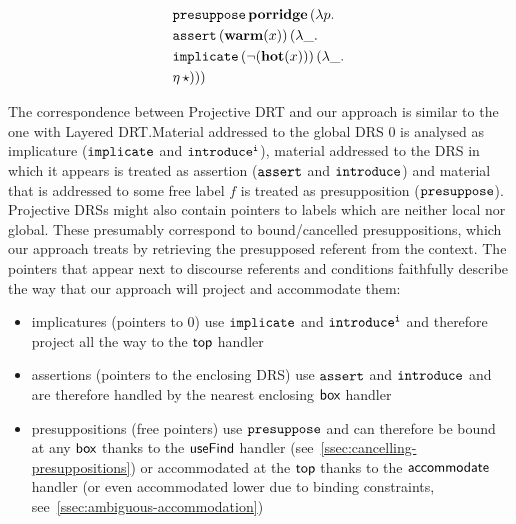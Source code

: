 \vspace*{3mm}
\begin{minipage}{.4\textwidth}
{
  \begin{center}
  \let \drsalignment = l
  \end{center}
}
\end{minipage}
\begin{minipage}{.4\textwidth}
  \begin{center}
  \begin{align*}
    &\mathtt{presuppose}\,\textbf{porridge}\,(\lambda p.\,  \\
    &\mathtt{assert}\,(\textbf{warm}(x))\,(\lambda \_.\,  \\
    &\mathtt{implicate}\,(\lnot (\textbf{hot}(x)))\,(\lambda \_.\,  \\
    &\eta\,\star)))
  \end{align*}
  \end{center}
\end{minipage}
\vspace{5mm}

The correspondence between Projective DRT and our approach is similar to
the one with Layered DRT.\@ Material addressed to the global DRS $0$ is
analysed as implicature ($\mathtt{implicate}$ and $\mathtt{introduce^i}$), material
addressed to the DRS in which it appears is treated as assertion
($\mathtt{assert}$ and $\mathtt{introduce}$) and material that is addressed to some
free label $f$ is treated as presupposition ($\mathtt{presuppose}$). Projective
DRSs might also contain pointers to labels which are neither local nor
global. These presumably correspond to bound/cancelled presuppositions,
which our approach treats by retrieving the presupposed referent from the
context. The pointers that appear next to discourse referents and
conditions faithfully describe the way that our approach will project and
accommodate them:

\begin{itemize}
\item implicatures (pointers to $0$) use $\mathtt{implicate}$ and
  $\mathtt{introduce^i}$ and therefore project all the way to the $\textsf{top}$
  handler
\item assertions (pointers to the enclosing DRS) use $\mathtt{assert}$ and
  $\mathtt{introduce}$ and are therefore handled by the nearest enclosing
  $\textsf{box}$ handler
\item presuppositions (free pointers) use $\mathtt{presuppose}$ and can
  therefore be bound at any $\textsf{box}$ thanks to the $\textsf{useFind}$ handler
  (see~\ref{ssec:cancelling-presuppositions}) or accommodated at the $\textsf{top}$
  thanks to the $\textsf{accommodate}$ handler (or even accommodated lower due to
  binding constraints, see~\ref{ssec:ambiguous-accommodation})
\end{itemize}


